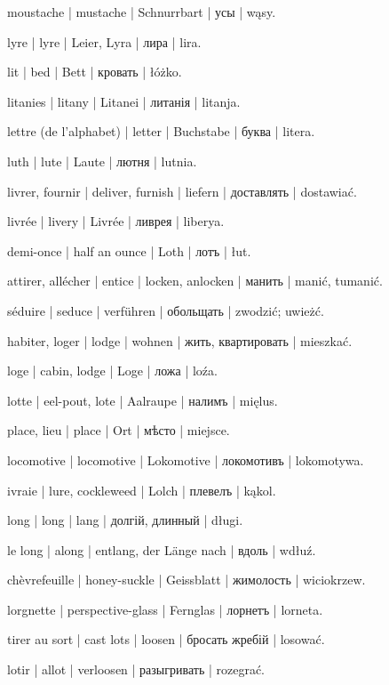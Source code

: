 \begin{outdent}{1em}
\uvsubentry{}
moustache | mustache | Schnurrbart | усы | wąsy.

lyre | lyre | Leier, Lyra | лира | lira.

lit | bed | Bett | кровать | łóżko.

litanies | litany | Litanei | литанія | litanja.

lettre (de l’alphabet) | letter | Buchstabe | буква | litera.

luth | lute | Laute | лютня | lutnia.

livrer, fournir | deliver, furnish | liefern | доставлять | dostawiać.

livrée | livery | Livrée | ливрея | liberya.

demi-once | half an ounce | Loth | лотъ | łut.

attirer, allécher | entice | locken, anlocken | манить | manić, tumanić.

\uvsubentry{}
séduire | seduce | verführen | обольщать | zwodzić; uwieżć.

habiter, loger | lodge | wohnen | жить, квартировать | mieszkać.

loge | cabin, lodge | Loge | ложа | loźa.

lotte | eel-pout, lote | Aalraupe | налимъ | mięlus.

place, lieu | place | Ort | мѣсто | miejsce.

locomotive | locomotive | Lokomotive | локомотивъ | lokomotywa.

ivraie | lure, cockleweed | Lolch | плевелъ | kąkol.

long | long | lang | долгій, длинный | długi.

\uvsubentry{}
le long | along | entlang, der Länge nach | вдоль | wdłuź.

chèvrefeuille | honey-suckle | Geissblatt | жимолость | wiciokrzew.

lorgnette | perspective-glass | Fernglas | лорнетъ | lorneta.

tirer au sort | cast lots | loosen | бросать жребій | losować.

\uvsubentry{}
lotir | allot | verloosen | разыгривать | rozegrać.


\end{outdent}
